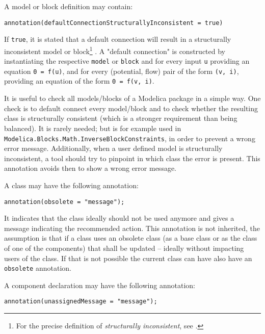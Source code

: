 A model or block definition may contain:
\begin{lstlisting}[language=modelica]
annotation(defaultConnectionStructurallyInconsistent = true)
\end{lstlisting}%

If \lstinline!true!, it is stated that a default connection will result in a structurally inconsistent model or block\footnote{%
  For the precise definition of \emph{structurally inconsistent}, see \textcite{Pantelides1988ConsistentInitialization}.}%
.
A "default connection" is constructed by instantiating the respective \lstinline!model! or \lstinline!block! and for every input \lstinline!u! providing an equation \lstinline!0 = f(u)!, and for every (potential, flow) pair of the form \lstinline!(v, i)!, providing an equation of the form \lstinline!0 = f(v, i)!.

\begin{nonnormative}
It is useful to check all models/blocks of a Modelica package in a simple way.  One check is to default connect every model/block and to check whether the resulting class is structurally consistent (which is a stronger requirement than being balanced).  It is rarely needed; but is for example used in \lstinline!Modelica.Blocks.Math.InverseBlockConstraints!, in order to prevent a wrong error message.  Additionally, when a user defined model is structurally inconsistent, a tool should try to pinpoint in which class the error is present.  This annotation avoids then to show a wrong error message.
\end{nonnormative}

A class may have the following annotation:
\begin{lstlisting}[language=modelica]
annotation(obsolete = "message");
\end{lstlisting}%

It indicates that the class ideally should not be used anymore and gives a message indicating the recommended action.
This annotation is not inherited, the assumption is that if a class uses an obsolete class (as a base class or as the class of one of the components) that shall be updated -- ideally without impacting users of the class.
If that is not possible the current class can have also have an \lstinline!obsolete! annotation.

A component declaration may have the following annotation:
\begin{lstlisting}[language=modelica]
annotation(unassignedMessage = "message");
\end{lstlisting}%


